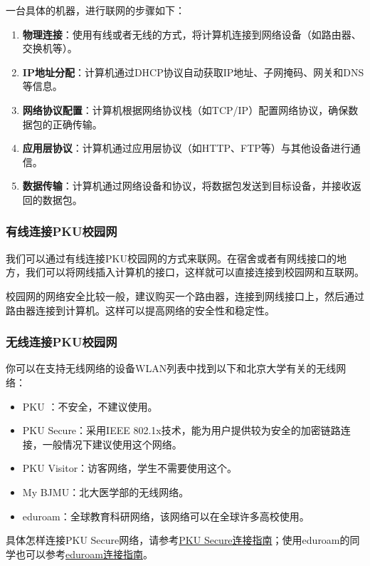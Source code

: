 一台具体的机器，进行联网的步骤如下：
\begin{enumerate}
  \item \textbf{物理连接}：使用有线或者无线的方式，将计算机连接到网络设备（如路由器、交换机等）。
  \item \textbf{IP地址分配}：计算机通过DHCP协议自动获取IP地址、子网掩码、网关和DNS等信息。
  \item \textbf{网络协议配置}：计算机根据网络协议栈（如TCP/IP）配置网络协议，确保数据包的正确传输。
  \item \textbf{应用层协议}：计算机通过应用层协议（如HTTP、FTP等）与其他设备进行通信。
  \item \textbf{数据传输}：计算机通过网络设备和协议，将数据包发送到目标设备，并接收返回的数据包。
\end{enumerate}

\subsubsection{有线连接PKU校园网}

我们可以通过有线连接PKU校园网的方式来联网。在宿舍或者有网线接口的地方，我们可以将网线插入计算机的接口，这样就可以直接连接到校园网和互联网。

校园网的网络安全比较一般，建议购买一个路由器，连接到网线接口上，然后通过路由器连接到计算机。这样可以提高网络的安全性和稳定性。

\subsubsection{无线连接PKU校园网}

你可以在支持无线网络的设备WLAN列表中找到以下和北京大学有关的无线网络：
\begin{itemize}
  \item PKU ：不安全，不建议使用。
  \item PKU Secure：采用IEEE 802.1x技术，能为用户提供较为安全的加密链路连接，一般情况下建议使用这个网络。
  \item PKU Visitor：访客网络，学生不需要使用这个。
  \item My BJMU：北大医学部的无线网络。
  \item eduroam：全球教育科研网络，该网络可以在全球许多高校使用。
\end{itemize}
具体怎样连接PKU Secure网络，请参考\href{https://its.pku.edu.cn/setting_6.jsp}{PKU Secure连接指南}；使用eduroam的同学也可以参考\href{https://its.pku.edu.cn/service_1_eduroam.jsp}{eduroam连接指南}。

